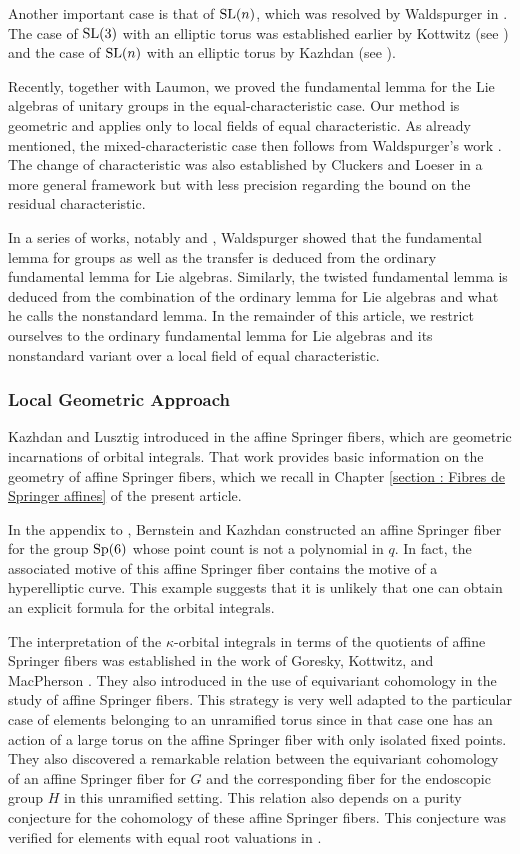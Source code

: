 \documentclass[12pt,english]{smfart}
\numberwithin{equation}{subsection}
\theoremstyle{remark}
\newcommand\SL{{\rm SL}}
\newcommand\Sp{{\rm Sp}}
\begin{document}
Another important case is that of $\SL(n)$, which was resolved by Waldspurger in \cite{W-SL}. The case of $\SL(3)$ with an elliptic torus was established earlier by Kottwitz (see \cite{K-SL(3)}) and the case of $\SL(n)$ with an elliptic torus by Kazhdan (see \cite{Ka}).

Recently, together with Laumon, we proved the fundamental lemma for the Lie algebras of unitary groups in the equal-characteristic case. Our method is geometric and applies only to local fields of equal characteristic. As already mentioned, the mixed-characteristic case then follows from Waldspurger's work \cite{W}. The change of characteristic was also established by Cluckers and Loeser \cite{CL2} in a more general framework but with less precision regarding the bound on the residual characteristic.

In a series of works, notably \cite{W-Trans} and \cite{W-tordu}, Waldspurger showed that the fundamental lemma for groups as well as the transfer is deduced from the ordinary fundamental lemma for Lie algebras. Similarly, the twisted fundamental lemma is deduced from the combination of the ordinary lemma for Lie algebras and what he calls the nonstandard lemma. In the remainder of this article, we restrict ourselves to the ordinary fundamental lemma for Lie algebras and its nonstandard variant over a local field of equal characteristic.

\subsubsection*{Local Geometric Approach}
Kazhdan and Lusztig introduced in \cite{KL} the affine Springer fibers, which are geometric incarnations of orbital integrals. That work provides basic information on the geometry of affine Springer fibers, which we recall in Chapter \ref{section : Fibres de Springer affines} of the present article.

In the appendix to \cite{KL}, Bernstein and Kazhdan constructed an affine Springer fiber for the group $\Sp(6)$ whose point count is not a polynomial in $q$. In fact, the associated motive of this affine Springer fiber contains the motive of a hyperelliptic curve. This example suggests that it is unlikely that one can obtain an explicit formula for the orbital integrals.

The interpretation of the $\kappa$-orbital integrals in terms of the quotients of affine Springer fibers was established in the work of Goresky, Kottwitz, and MacPherson \cite{GKM}. They also introduced in \cite{GKM} the use of equivariant cohomology in the study of affine Springer fibers. This strategy is very well adapted to the particular case of elements belonging to an unramified torus since in that case one has an action of a large torus on the affine Springer fiber with only isolated fixed points. They also discovered a remarkable relation between the equivariant cohomology of an affine Springer fiber for $G$ and the corresponding fiber for the endoscopic group $H$ in this unramified setting. This relation also depends on a purity conjecture for the cohomology of these affine Springer fibers. This conjecture was verified for elements with equal root valuations in \cite{GKM-equivaluation}.
\end{document}
